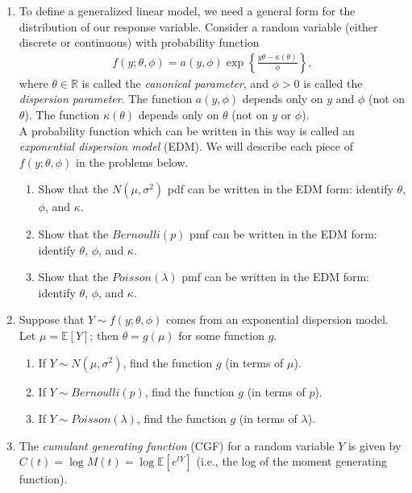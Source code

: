 \documentclass[11pt]{article}
\begin{document}
\begin{enumerate}
\item To define a generalized linear model, we need a general form for the distribution of our response variable. Consider a random variable (either discrete or continuous) with probability function
\begin{align*}
f(y; \theta, \phi) = a(y, \phi) \exp\left\lbrace\frac{y \theta - \kappa(\theta)}{\phi}\right\rbrace,
\end{align*}
where $\theta \in \mathbb{R}$ is called the \textit{canonical parameter}, and $\phi > 0$ is called the \textit{dispersion parameter}. The function $a(y, \phi)$ depends only on $y$ and $\phi$ (not on $\theta$). The function $\kappa(\theta)$ depends only on $\theta$ (not on $y$ or $\phi$). \\

\noindent A probability function which can be written in this way is called an \textit{exponential dispersion model} (EDM). We will describe each piece of $f(y; \theta, \phi)$ in the problems below.

\begin{enumerate}
\item Show that the $N(\mu, \sigma^2)$ pdf can be written in the EDM form: identify $\theta$, $\phi$, and $\kappa$.

\item Show that the $Bernoulli(p)$ pmf can be written in the EDM form: identify $\theta$, $\phi$, and $\kappa$.

\item Show that the $Poisson(\lambda)$ pmf can be written in the EDM form: identify $\theta$, $\phi$, and $\kappa$.
\end{enumerate}

\item Suppose that $Y \sim f(y; \theta, \phi)$ comes from an exponential dispersion model. Let $\mu = \mathbb{E}[Y]$; then $\theta = g(\mu)$ for some function $g$.

\begin{enumerate}
\item If $Y \sim N(\mu, \sigma^2)$, find the function $g$ (in terms of $\mu$).
\item If $Y \sim Bernoulli(p)$, find the function $g$ (in terms of $p$).
\item If $Y \sim Poisson(\lambda)$, find the function $g$ (in terms of $\lambda$).
\end{enumerate}

\item The \textit{cumulant generating function} (CGF) for a random variable $Y$ is given by $C(t) = \log M(t) = \log \mathbb{E}[e^{tY}]$ (i.e., the log of the moment generating function).


\end{enumerate}
\end{document}
